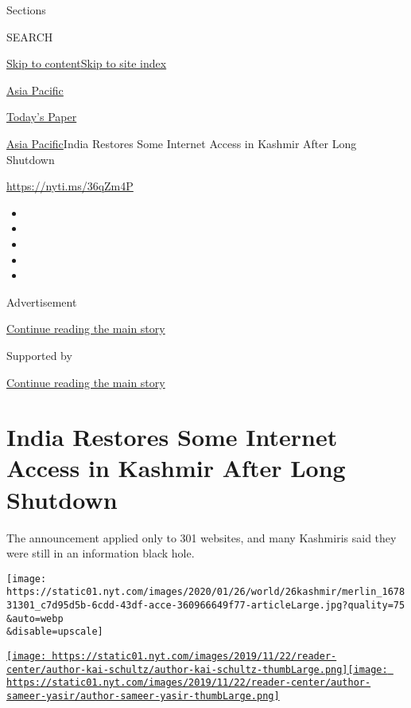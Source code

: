 Sections

SEARCH

\protect\hyperlink{site-content}{Skip to
content}\protect\hyperlink{site-index}{Skip to site index}

\href{https://www.nytimes.com/section/world/asia}{Asia Pacific}

\href{https://myaccount.nytimes.com/auth/login?response_type=cookie\&client_id=vi}{}

\href{https://www.nytimes.com/section/todayspaper}{Today's Paper}

\href{/section/world/asia}{Asia Pacific}\textbar{}India Restores Some
Internet Access in Kashmir After Long Shutdown

\href{https://nyti.ms/36qZm4P}{https://nyti.ms/36qZm4P}

\begin{itemize}
\item
\item
\item
\item
\item
\end{itemize}

Advertisement

\protect\hyperlink{after-top}{Continue reading the main story}

Supported by

\protect\hyperlink{after-sponsor}{Continue reading the main story}

\hypertarget{india-restores-some-internet-access-in-kashmir-after-long-shutdown}{%
\section{India Restores Some Internet Access in Kashmir After Long
Shutdown}\label{india-restores-some-internet-access-in-kashmir-after-long-shutdown}}

The announcement applied only to 301 websites, and many Kashmiris said
they were still in an information black hole.

\texttt{[image: https://static01.nyt.com/images/2020/01/26/world/26kashmir/merlin\_167831301\_c7d95d5b-6cdd-43df-acce-360966649f77-articleLarge.jpg?quality=75\\\&auto=webp\\\&disable=upscale]}

\href{https://www.nytimes.com/by/kai-schultz}{\texttt{[image: https://static01.nyt.com/images/2019/11/22/reader-center/author-kai-schultz/author-kai-schultz-thumbLarge.png]}}\href{https://www.nytimes.com/by/sameer-yasir}{\texttt{[image: https://static01.nyt.com/images/2019/11/22/reader-center/author-sameer-yasir/author-sameer-yasir-thumbLarge.png]}}

